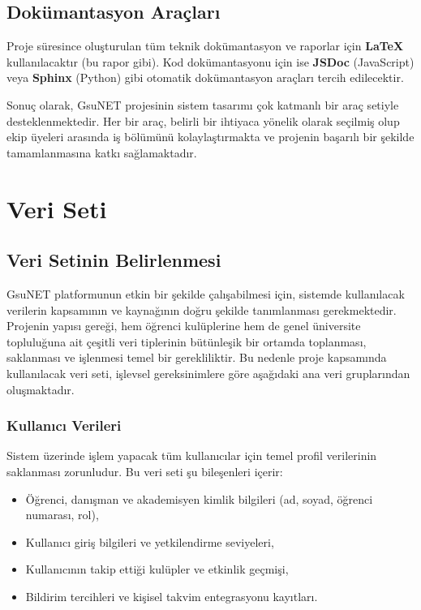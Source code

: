 \documentclass[a4paper,12pt]{report}
\begin{document}
\section{Dokümantasyon Araçları}

Proje süresince oluşturulan tüm teknik dokümantasyon ve raporlar için \textbf{LaTeX} kullanılacaktır (bu rapor gibi). Kod dokümantasyonu için ise \textbf{JSDoc} (JavaScript) veya \textbf{Sphinx} (Python) gibi otomatik dokümantasyon araçları tercih edilecektir.

\bigskip

Sonuç olarak, GsuNET projesinin sistem tasarımı çok katmanlı bir araç setiyle desteklenmektedir. Her bir araç, belirli bir ihtiyaca yönelik olarak seçilmiş olup ekip üyeleri arasında iş bölümünü kolaylaştırmakta ve projenin başarılı bir şekilde tamamlanmasına katkı sağlamaktadır.

\chapter{Veri Seti}

\section{Veri Setinin Belirlenmesi}

GsuNET platformunun etkin bir şekilde çalışabilmesi için, sistemde kullanılacak verilerin kapsamının ve kaynağının doğru şekilde tanımlanması gerekmektedir. Projenin yapısı gereği, hem öğrenci kulüplerine hem de genel üniversite topluluğuna ait çeşitli veri tiplerinin bütünleşik bir ortamda toplanması, saklanması ve işlenmesi temel bir gerekliliktir. Bu nedenle proje kapsamında kullanılacak veri seti, işlevsel gereksinimlere göre aşağıdaki ana veri gruplarından oluşmaktadır.

\subsection{Kullanıcı Verileri}

Sistem üzerinde işlem yapacak tüm kullanıcılar için temel profil verilerinin saklanması zorunludur. Bu veri seti şu bileşenleri içerir:

\begin{itemize}
    \item Öğrenci, danışman ve akademisyen kimlik bilgileri (ad, soyad, öğrenci numarası, rol),
    \item Kullanıcı giriş bilgileri ve yetkilendirme seviyeleri,
    \item Kullanıcının takip ettiği kulüpler ve etkinlik geçmişi,
    \item Bildirim tercihleri ve kişisel takvim entegrasyonu kayıtları.
\end{itemize}
\end{document}
